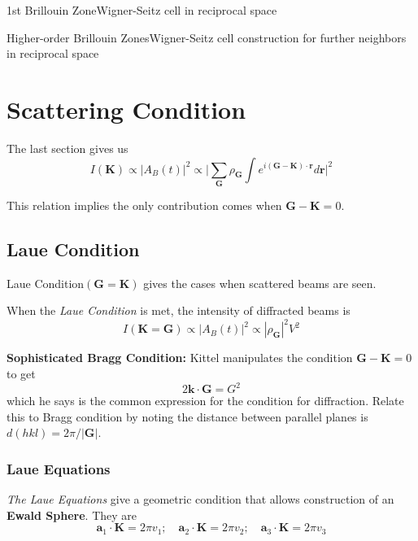 \begin{definition}
{1st Brillouin Zone}{Wigner-Seitz cell in reciprocal space}
\end{definition}
\begin{definition}
{Higher-order Brillouin Zones}{Wigner-Seitz cell construction for further neighbors in reciprocal space}
\end{definition}



\section{Scattering Condition}
The last section gives us
\begin{equation*}
    I(\mathbf{K}) \propto |A_B(t)|^2 \propto \bigg|\sum_\mathbf{G} \rho_\mathbf{G} \int e^{i(\mathbf{G}-\mathbf{K})\cdot \mathbf{r}} d\mathbf{r}\bigg|^2
\end{equation*}

This relation implies the only contribution comes when $\mathbf{G}-\mathbf{K}=0$.


\subsection{Laue Condition}
\begin{definition}
{Laue Condition}{$(\mathbf{G}=\mathbf{K})$ gives the cases when scattered beams are seen.}
\end{definition}
When the \emph{Laue Condition} is met, the intensity of diffracted beams is
\begin{equation*}
    I(\mathbf{K}=\mathbf{G}) \propto |A_B(t)|^2 \propto |\rho_\mathbf{G}|^2 V^2
\end{equation*}

\textbf{Sophisticated Bragg Condition:} Kittel manipulates the condition $\mathbf{G}-\mathbf{K}=0$ to get
\begin{equation} \label{eq:bragg2}
    2 \mathbf{k}\cdot \mathbf{G} = G^2
\end{equation}
which he says is the common expression for the condition for diffraction. Relate this to Bragg condition by noting the distance between parallel planes is $d(hkl)=2\pi/|\mathbf{G}|$.

\subsubsection{Laue Equations}
\textit{The Laue Equations} give a geometric condition that allows construction of an \textbf{Ewald Sphere}. They are
\begin{equation*}
    \mathbf{a}_1 \cdot \mathbf{K} = 2\pi v_1; \quad \mathbf{a}_2 \cdot \mathbf{K} = 2\pi v_2; \quad \mathbf{a}_3 \cdot \mathbf{K} = 2\pi v_3
\end{equation*}

